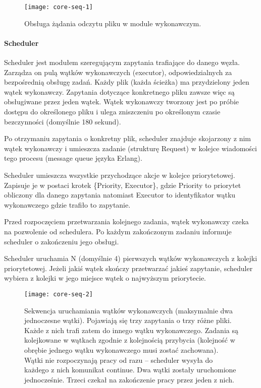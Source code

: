 \begin{figure}[!htbp]
	\centering
	\texttt{[image: core-seq-1]}
	\caption{Obsługa żądania odczytu pliku w module wykonawczym.}
	\label{fig:core-seq-1}
\end{figure}

\paragraph{Scheduler} Scheduler jest modułem szeregującym zapytania trafiające do danego węzła. Zarządza on pulą wątków wykonawczych (executor), odpowiedzialnych za bezpośrednią obsługę zadań. Każdy plik (każda ścieżka) ma przydzielony jeden wątek wykonawczy. Zapytania dotyczące konkretnego pliku zawsze więc są obsługiwane przez jeden wątek. Wątek wykonawczy tworzony jest po próbie dostępu do określonego pliku i ulega zniszczeniu po określonym czasie bezczynności (domyślnie 180 sekund).

Po otrzymaniu zapytania o konkretny plik, scheduler znajduje skojarzony z nim wątek wykonawczy i umieszcza zadanie (strukturę Request) w kolejce wiadomości tego procesu (message queue języka Erlang).

Scheduler umieszcza wszystkie przychodzące akcje w kolejce priorytetowej. Zapisuje je w postaci krotek \{Priority, Executor\}, gdzie Priority to priorytet obliczony dla danego zapytania natomiast Executor to identyfikator wątku wykonawczego gdzie trafiło to zapytanie.

Przed rozpoczęciem przetwarzania kolejnego zadania, wątek wykonawczy czeka na pozwolenie od schedulera. Po każdym zakończonym zadaniu informuje scheduler o zakończeniu jego obsługi.

Scheduler uruchamia N (domyślnie 4) pierwszych wątków wykonawczych z kolejki priorytetowej. Jeżeli jakiś wątek skończy przetwarzać jakieś zapytanie, scheduler wybiera z kolejki w jego miejsce wątek o najwyższym priorytecie.

\begin{figure}[!htbp]
	\centering
	\texttt{[image: core-seq-2]}
	\caption[Sekwencja uruchamiania wątków wykonawczych.]{Sekwencja uruchamiania wątków wykonawczych (maksymalnie dwa jednoczesne wątki). Pojawiają się trzy zapytania o trzy różne pliki. Każde z nich trafi zatem do innego wątku wykonawczego. Zadania są kolejkowane w wątkach zgodnie z kolejnością przybycia (kolejność w obrębie jednego wątku wykonawczego musi zostać zachowana). Wątki nie rozpoczynają pracy od razu – scheduler wysyła do każdego z nich komunikat continue. Dwa wątki zostały uruchomione jednocześnie. Trzeci czekał na zakończenie pracy przez jeden z nich.}
	\label{fig:core-seq-2}
\end{figure}
